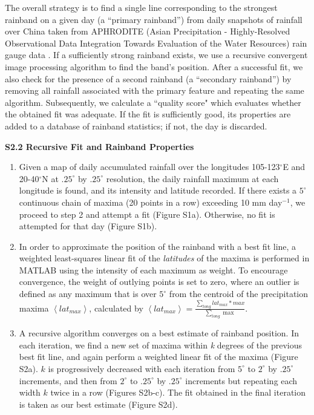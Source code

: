 \documentclass[draft,grl]{agutexSI}
\begin{document}
\begin{article}
The overall strategy is to find a single line corresponding to the strongest rainband on a given day (a ``primary rainband'') from daily snapshots of rainfall over China taken from APHRODITE (Asian Precipitation - Highly-Resolved Observational Data Integration Towards Evaluation of the Water Resources) rain gauge data \citep{Yatagai2012}. If a sufficiently strong rainband exists, we use a recursive convergent image processing algorithm to find the band's position. After a successful fit, we also check for the presence of a second rainband (a ``secondary rainband'') by removing all rainfall associated with the primary feature and repeating the same algorithm. Subsequently, we calculate a ``quality score" which evaluates whether the obtained fit was adequate. If the fit is sufficiently good, its properties are added to a database of rainband statistics; if not, the day is discarded.
\vspace{3mm}

\noindent\textbf{S2.2 Recursive Fit and Rainband Properties}

\begin{enumerate}
	\item Given a map of daily accumulated rainfall over the longitudes 105-123$^{\circ}$E and 20-40$^{\circ}$N at $.25^{\circ}$ by $.25^{\circ}$ resolution, the daily rainfall maximum at each longitude is found, and its intensity and latitude recorded. If there exists a $5^{\circ}$ continuous chain of maxima (20 points in a row) exceeding 10 mm day$^{-1}$, we proceed to step 2 and attempt a fit (Figure S1a). Otherwise, no fit is attempted for that day (Figure S1b).
	
	\item In order to approximate the position of the rainband with a best fit line, a weighted least-squares linear fit of the \textit{latitudes} of the maxima is performed in MATLAB using the intensity of each maximum as weight. To encourage convergence, the weight of outlying points is set to zero, where an outlier is defined as any maximum that is over $5^{\circ}$ from the centroid of the precipitation maxima $\left<lat_{max}\right>$, calculated by $\left<lat_{max}\right>=\frac{\sum_{long} lat_{max}*max}{\sum_{long} \max}$.
	
	\item A recursive algorithm converges on a best estimate of rainband position. In each iteration, we find a new set of maxima within \textit{k} degrees of the previous best fit line, and again perform a weighted linear fit of the maxima (Figure S2a). $k$ is progressively decreased with each iteration from $5^{\circ}$ to $2^{\circ}$ by $.25^{\circ}$ increments, and then from $2^{\circ}$ to $.25^{\circ}$ by $.25^{\circ}$ increments but repeating each width $k$ twice in a row (Figures S2b-c). The fit obtained in the final iteration is taken as our best estimate (Figure S2d).
	

\end{enumerate}
\end{article}
\end{document}
